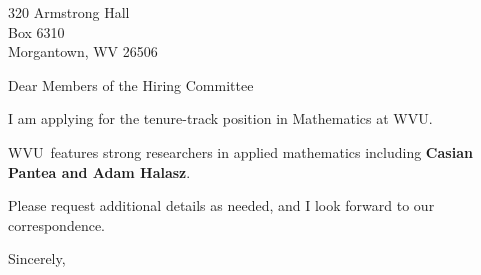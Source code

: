 




	
	
	\def\School{WVU}
	
	\begin{letter}
		{320 Armstrong Hall\\
			Box 6310\\
			Morgantown, WV 26506
		}
		
		\opening{Dear Members of the Hiring Committee}
		
		
		I am applying for the tenure-track position in Mathematics at \School. 
		
		\School~features strong researchers in applied mathematics including \textbf{Casian Pantea and Adam Halasz}. 
		
		
		
		
		
		Please request additional details as needed, and I look forward to our correspondence.
		
		\closing{Sincerely,}
	\end{letter}
